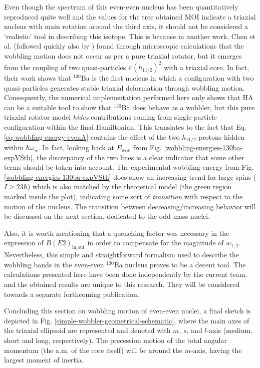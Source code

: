 Even though the spectrum of this even-even nucleus has been quantitatively reproduced quite well and the values for the tree obtained MOI indicate a triaxial nucleus with main rotation around the third axis, it should not be considered a `realistic' tool in describing this isotope. This is because in another work, Chen et al. \cite{chen2019transverse} (followed quickly also by \cite{wang2020two}) found through microscopic calculations that the wobbling motion does not occur as per a pure triaxial rotator, but it emerges from the coupling of two quasi-particles $\pi(h_{11/2})^2$ with a triaxial core. In fact, their work shows that $^{130}$Ba is the first nucleus in which a configuration with two quasi-particles generates stable triaxial deformation through wobbling motion. Consequently, the numerical implementation performed here only shows that HA can be a suitable tool to show that $^{130}$Ba does behave as a wobbler, but this pure triaxial rotator model \emph{hides} contributions coming from single-particle configuration within the final Hamiltonian. This translates to the fact that Eq. \ref{eq-wobbling-energy-evenA} contains the effect of the two $h_{11/2}$ protons hidden within $\hbar\omega_w$. In fact, looking back at $E_\text{wob}$ from Fig. \ref{wobbling-energies-130ba-expVSth}, the discrepancy of the two lines is a clear indicator that some other terms should be taken into account. The experimental wobbling energy from Fig. \ref{wobbling-energies-130ba-expVSth} does show an increasing trend for large spins ($I\geq 23\hbar$) which is also matched by the theoretical model (the green region marked inside the plot), indicating some sort of \emph{transition} with respect to the motion of the nucleus. The transition between decreasing/increasing behavior will be discussed on the next section, dedicated to the odd-mass nuclei.

Also, it is worth mentioning that a quenching factor was necessary in the expression of $B(E2)_\text{in,out}$ in order to compensate for the magnitude of $w_{1,2}$. Nevertheless, this simple and straightforward formalism used to describe the wobbling bands in the even-even $^{130}$Ba nucleus proves to be a decent tool. The calculations presented here have been done independently by the current team, and the obtained results are unique to this research. They will be considered towards a separate forthcoming publication.

Concluding this section on wobbling motion of even-even nuclei, a final sketch is depicted in Fig. \ref{simple-wobbler-geometrical-schematic}, where the main axes of the triaxial ellipsoid are represented and denoted with $m$, $s$, and $l$-axis (medium, short and long, respectively). The precession motion of the total angular momentum (the a.m. of the core itself) will be around the $m$-axis, having the largest moment of inertia.

